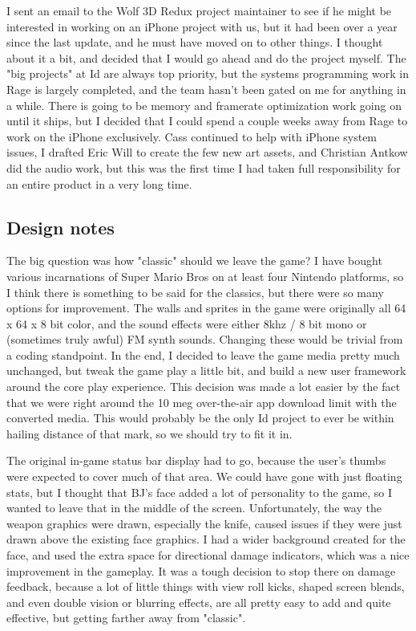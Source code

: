I sent an email to the Wolf 3D Redux project maintainer to see if he might be interested in working on an iPhone project with us, but it had been over a year since the last update, and he must have moved on to other things.  I thought about it a bit, and decided that I would go ahead and do the project myself.  The "big projects" at Id are always top priority, but the systems programming work in Rage is largely completed, and the team hasn't been gated on me for anything in a while.  There is going to be memory and framerate optimization  work going on until it ships, but I decided that I could spend a couple weeks away from Rage to work on the iPhone exclusively.  Cass continued to help with iPhone system issues, I drafted Eric Will to create the few new art assets, and Christian Antkow did the audio work, but this was the first time I had taken full responsibility for an entire product in a very long time.\\
\par

\subsection{Design notes}

The big question was how "classic" should we leave the game?  I have bought various incarnations of Super Mario Bros on at least four Nintendo platforms, so I think there is something to be said for the classics, but there were so many options for improvement.  The walls and sprites in the game were originally all 64 x 64 x 8 bit color, and the sound effects were either 8khz / 8 bit mono or (sometimes truly awful) FM synth sounds.  Changing these would be trivial from a coding standpoint.  In the end, I decided to leave the game media pretty much unchanged, but tweak the game play a little bit, and build a new user framework around the core play experience.  This decision was made a lot easier by the fact that we were right around the 10 meg over-the-air app download limit with the converted media.  This would probably be the only Id project to ever be within hailing distance of that mark, so we should try to fit it in.\\
\par

The original in-game status bar display had to go, because the user's thumbs were expected to cover much of that area.  We could have gone with just floating stats, but I thought that BJ's face added a lot of personality to the game, so I wanted to leave that in the middle of the screen.  Unfortunately, the way the weapon graphics were drawn, especially the knife, caused issues if they were just drawn above the existing face graphics.  I had a wider background created for the face, and used the extra space for directional damage indicators, which was a nice improvement in the gameplay.  It was a tough decision to stop there on damage feedback, because a lot of little things with view roll kicks, shaped screen blends, and even double vision or blurring effects, are all pretty easy to add and quite effective, but getting farther away from "classic".\\
\par

